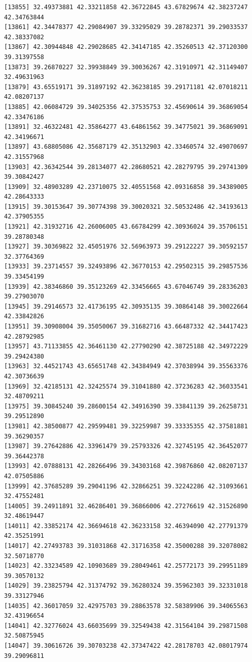 \documentclass[
  letterpaper,
  DIV=11,
  numbers=noendperiod]{scrartcl}
\begin{document}
\begin{verbatim}
[13855] 32.49373881 42.33211858 42.36722845 43.67829674 42.38237247 42.34763844
[13861] 42.34478377 42.29084907 39.33295029 39.28782371 39.29033537 42.38337082
[13867] 42.30944848 42.29028685 42.34147185 42.35260513 42.37120300 39.31397558
[13873] 39.26870227 32.39938849 39.30036267 42.31910971 42.31149407 32.49631963
[13879] 43.65519171 39.31897192 42.36238185 39.29171181 42.07018211 42.08207137
[13885] 42.06084729 39.34025356 42.37535753 32.45690614 39.36869054 42.33476186
[13891] 32.46322481 42.35864277 43.64861562 39.34775021 39.36869091 42.34196671
[13897] 43.68805086 42.35687179 42.35132903 42.33460574 32.49070697 42.31557968
[13903] 42.36342544 39.28134077 42.28680521 42.28279795 39.29741309 39.30842427
[13909] 32.48903289 42.23710075 32.40551568 42.09316858 39.34389005 42.28643333
[13915] 39.30153647 39.30774398 39.30020321 32.50532486 42.34193613 42.37905355
[13921] 42.31932716 42.26006005 43.66784299 42.30936024 39.35706151 39.28780348
[13927] 39.30369822 32.45051976 32.56963973 39.29122227 39.30592157 32.37764369
[13933] 39.23714557 39.32493896 42.36770153 42.29502315 39.29857536 39.33454199
[13939] 42.38346860 39.35123269 42.33456665 43.67046749 39.28336203 39.27903070
[13945] 39.29146573 32.41736195 42.30935135 39.30864148 39.30022664 42.33842826
[13951] 39.30908004 39.35050067 39.31682716 43.66487332 42.34417423 42.28792985
[13957] 43.71133855 42.36461130 42.27790290 42.38725188 42.34972229 39.29424380
[13963] 32.44521743 43.65651748 42.34384949 42.37038994 39.35563376 42.30736639
[13969] 32.42185131 42.32425574 39.31041880 42.37236283 42.36033541 32.48709211
[13975] 39.30845240 39.28600154 42.34916390 39.33841139 39.26258731 39.29512890
[13981] 42.38500877 42.29599481 39.32259987 39.33335355 42.37581881 39.36290357
[13987] 39.27642886 42.33961479 39.25793326 42.32745195 42.36452077 39.36442378
[13993] 42.07888131 42.28266496 39.34303168 42.39876860 42.08207137 42.07505886
[13999] 42.37685289 39.29041196 42.32866251 39.32242286 42.31093661 32.47552481
[14005] 39.24911891 32.46286401 39.36866006 42.27276619 42.31526890 32.48619447
[14011] 42.33852174 42.36694618 42.36233158 32.46394090 42.27791379 42.35251991
[14017] 42.27493783 39.31031868 42.31716358 42.35000288 39.32078082 32.50718770
[14023] 42.33234589 42.10903689 39.28049461 42.25772173 39.29951189 39.30570132
[14029] 39.23825794 42.31374792 39.36280324 39.35962303 39.32331018 39.33127946
[14035] 42.36017059 32.42975703 39.28863578 32.58389906 39.34065563 32.43196654
[14041] 42.32776024 43.66035699 39.32549438 42.31564104 39.29871508 32.50875945
[14047] 39.30616726 39.30703238 42.37347422 42.28178703 42.08017974 39.29096811

\end{verbatim}
\end{document}
